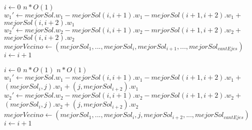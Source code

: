 \begin{flushleft}
 \begin{figure}[H]
  \begin{pseudo}
   \State $i \leftarrow 0$
   \hfill$n*O(1)$
	  \State $w_1' \leftarrow mejorSol.w_1 - mejorSol(i,i+1).w_1 - mejorSol(i+1,i+2).w_1 + $
	  \State$mejorSol(i,i+2).w_1$
	  \State $w_2' \leftarrow mejorSol.w_2 - mejorSol(i,i+1).w_2 - mrjorSol(i+1,i+2).w_2 + $
	  \State $mejorSol(i,i+2).w_2$
	    \State $mejorVecino \leftarrow (mejorSol_1, ... ,mejorSol_i, mejorSol_{i+1}, ..., mejorSol_{cantEjes})$
	  \EndIf
      \EndIf
      \State $i \leftarrow i+1$
   \EndWhile
   \EndProcedure
  \end{pseudo}
 \end{figure}
\end{flushleft}

\begin{flushleft}
 \begin{figure}[H]
  \begin{pseudo}
   \State $i \leftarrow 0$
   \hfill$n*O(1)$
      \hfill$n*O(1)$
	  \State $w_1' \leftarrow mejorSol.w_1 - mejorSol(i,i+1).w_1 - mejorSol(i+1,i+2).w_1 + $
	  \State $(mejorSol_i, j).w_1 + (j, mejorSol_{i+2}).w_1$
	  \State $w_2' \leftarrow mejorSol.w_2 - mejorSol(i,i+1).w_2 - mejorSol(i+1,i+2).w_2 + $
	  \State $(mejorSol_i, j).w_2 + (j, mejorSol_{i+2}).w_2$
	    \State $mejorVecino \leftarrow (mejorSol_1, ... ,mejorSol_i, j ,mejorSol_{i+2}, ..., mejorSol_{cantEjes})$
	  \EndIf
      \EndFor
      \State $i \leftarrow i+1$
   \EndWhile
   \EndProcedure
  \end{pseudo}
 \end{figure}
\end{flushleft}
